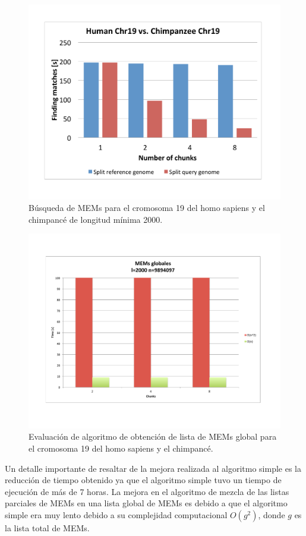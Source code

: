 \documentclass[12pt,a4paper]{article}
\begin{document}
   \begin{figure}[h] 
   \centering 
   \includegraphics[scale=0.4]{hspan.pdf} 
   \caption{Búsqueda de MEMs para el cromosoma 19 del homo sapiens y el chimpanc\'e de longitud mínima 2000.} 
   \label{fig:hspanFind} 
 \end{figure}
   \begin{figure}[h] 
   \centering 
   \includegraphics[scale=0.4]{hspanMEMGlobal.pdf} 
   \caption{Evaluación de algoritmo de obtención de lista de MEMs global para el cromosoma 19 del homo sapiens y el chimpanc\'e.} 
   \label{fig:hspanMEMGlobal} 
 \end{figure}
Un detalle importante de resaltar de la mejora realizada al algoritmo simple es la reducción de tiempo obtenido ya que el algoritmo simple tuvo un tiempo de ejecución de más de 7 horas. La mejora en el algoritmo de mezcla de las listas parciales de MEMs en una lista global de MEMs es debido a que el algoritmo simple era muy lento debido a su complejidad computacional $O(g^2)$, donde $g$ es la lista total de MEMs.\\
\end{document}
